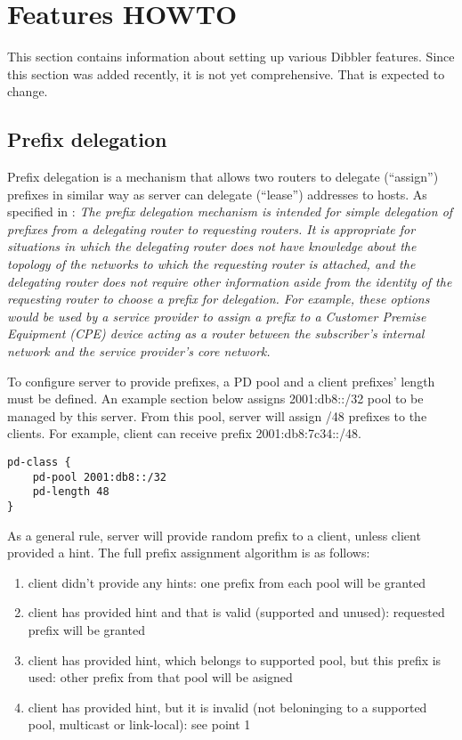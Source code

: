 \newpage
\section{Features HOWTO}
This section contains information about setting up various Dibbler
features. Since this section was added recently, it is not yet
comprehensive. That is expected to change.

\subsection{Prefix delegation}
\label{feature-prefix}
Prefix delegation is a mechanism that allows two routers to delegate
(``assign'') prefixes in similar way as server can delegate
(``lease'') addresses to hosts. As specified in \cite{rfc3633}: \emph{
  The prefix delegation mechanism is intended for simple delegation of
  prefixes from a delegating router to requesting routers.  It is
  appropriate for situations in which the delegating router does not
  have knowledge about the topology of the networks to which the
  requesting router is attached, and the delegating router does not
  require other information aside from the identity of the requesting
  router to choose a prefix for delegation.  For example, these
  options would be used by a service provider to assign a prefix to a
  Customer Premise Equipment (CPE) device acting as a router between
  the subscriber's internal network and the service provider's core
  network.}

To configure server to provide prefixes, a PD pool and a client 
prefixes' length must be defined. An example section below assigns
2001:db8::/32 pool to be managed by this server. From this pool,
server will assign /48 prefixes to the clients. For example, client
can receive prefix 2001:db8:7c34::/48.

\begin{lstlisting}
pd-class {
    pd-pool 2001:db8::/32
    pd-length 48
}
\end{lstlisting}

As a general rule, server will provide random prefix to a client,
unless client provided a hint. The full prefix assignment algorithm is
as follows:

\begin{enumerate}
\item client didn't provide any hints: one prefix from each pool will
  be granted
\item client has provided hint and that is valid (supported and
  unused): requested prefix will be granted
\item client has provided hint, which belongs to supported pool, but
  this prefix is used: other prefix from that pool will be asigned
\item client has provided hint, but it is invalid (not beloninging to
  a supported pool, multicast or link-local): see point 1
\end{enumerate}

